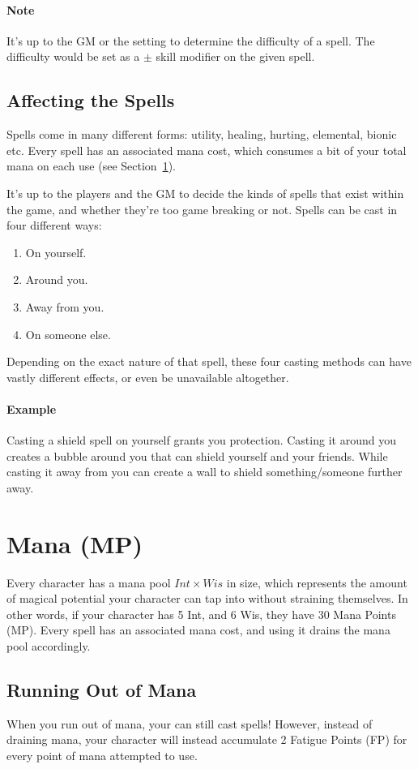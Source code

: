 \paragraph{Note} It's up to the GM or the setting to determine the difficulty of a spell.
The difficulty would be set as a $\pm$ skill modifier on the given spell.

\subsection{Affecting the Spells}
Spells come in many different forms: utility, healing, hurting, elemental, bionic etc.
Every spell has an associated mana cost, which consumes a bit of your total mana on each use (see Section~\ref{sec:mana}).

It's up to the players and the GM to decide the kinds of spells that exist within the game, and whether they're too game breaking or not.
Spells can be cast in four different ways:
\begin{enumerate}
  \item On yourself.
  \item Around you.
  \item Away from you.
  \item On someone else.
\end{enumerate}
Depending on the exact nature of that spell, these four casting methods can have vastly different effects, or even be unavailable altogether.

\paragraph{Example} Casting a shield spell on yourself grants you protection.
Casting it around you creates a bubble around you that can shield yourself and your friends.
While casting it away from you can create a wall to shield something/someone further away.

\section{Mana (MP)}\label{sec:mana}
Every character has a mana pool $Int \times Wis$ in size, which represents the amount of magical potential your character can tap into without straining themselves.
In other words, if your character has 5 Int, and 6 Wis, they have 30 Mana Points (MP).
Every spell has an associated mana cost, and using it drains the mana pool accordingly.

\subsection{Running Out of Mana}
When you run out of mana, your can still cast spells!
However, instead of draining mana, your character will instead accumulate 2 Fatigue Points (FP) for every point of mana attempted to use.

